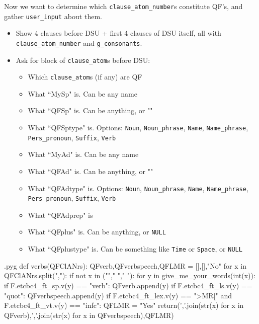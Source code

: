 \documentclass{report}
\makeatletter
\newcommand{\mi}[1]{\lstinline{#1}}
\newenvironment{python}{%
  \VerbatimEnvironment
  \minted@resetoptions
  \setkeys{minted@opt}{}
      \begin{VerbatimOut}{\jobname.pyg}}
{%
      \end{VerbatimOut}
      \minted@pygmentize{python}
      \DeleteFile{\jobname.pyg}}
\makeatother
\begin{document}
\begin{multicols}{2}
Now we want to determine which \mi{clause_atom_number}s constitute QF's, and gather \mi{user_input} about them.
\begin{itemize}
 \item Show 4 clauses before DSU + first 4 clauses of DSU itself, all with \mi{clause_atom_number} and \mi{g_consonants}.
 \item Ask for block of \mi{clause_atom}s before DSU:
 \begin{itemize}
    \item Which \mi{clause_atom}s (if any) are QF
    \item What ``MySp" is. Can be any name
    \item What ``QFSp" is. Can be anything, or ""
    \item What ``QFSptype" is. Options: \mi{Noun}, \mi{Noun_phrase}, \mi{Name}, \mi{Name_phrase}, \mi{Pers_pronoun}, \mi{Suffix}, \mi{Verb}
    \item What ``MyAd" is. Can be any name
    \item What ``QFAd" is. Can be anything, or ""
    \item What ``QFAdtype" is. Options: \mi{Noun}, \mi{Noun_phrase}, \mi{Name}, \mi{Name_phrase}, \mi{Pers_pronoun}, \mi{Suffix}, \mi{Verb}
    \item What ``QFAdprep" is
    \item What ``QFplus" is. Can be anything, or \mi{NULL}
    \item What ``QFplustype" is. Can be something like \mi{Time} or \mi{Space}, or \mi{NULL}
  \end{itemize}
\end{itemize}
\end{multicols}

\begin{python}
def verbs(QFClANrs):
    QFverb,QFverbspeech,QFLMR = [],[],"No"
    for x in QFClANrs.split(","):
        if not x in (""," ","  "):
            for y in give_me_your_words(int(x)):
                if F.etcbc4_ft_sp.v(y) == "verb":
                    QFverb.append(y)
                    if F.etcbc4_ft_ls.v(y) == "quot":
                        QFverbspeech.append(y)
                        if F.etcbc4_ft_lex.v(y) == ">MR[" and F.etcbc4_ft_vt.v(y) == "infc":
                            QFLMR = "Yes"
    return(','.join(str(x) for x in QFverb),','.join(str(x) for x in QFverbspeech),QFLMR)

\end{python}
\end{document}
